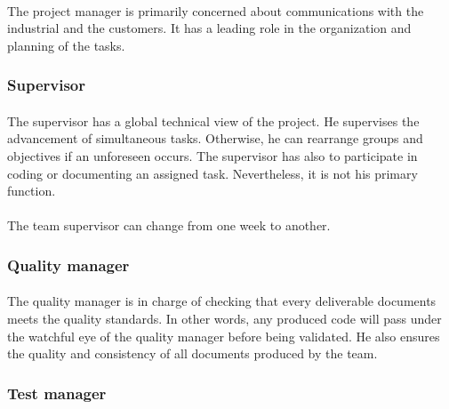 \documentclass{report}
\begin{document}
\paragraph{}
\hspace{4mm}The project manager is primarily concerned about communications with the industrial and the customers. It has a leading role in the organization and planning of the tasks.

\subsubsection{Supervisor}

\paragraph{}
\hspace{4mm}The supervisor has a global technical view of the project. He supervises the advancement of simultaneous tasks. Otherwise, he can rearrange groups and objectives if an unforeseen occurs. The supervisor has also to participate in coding or documenting an assigned task. Nevertheless, it is not his primary function.

\paragraph{}
\hspace{4mm}The team supervisor can change from one week to another.

\subsubsection{Quality manager}

\paragraph{}
\hspace{4mm}The quality manager is in charge of checking that every deliverable documents meets the quality standards. In other words, any produced code will pass under the watchful eye of the quality manager before being validated. He also ensures the quality and consistency of all documents produced by the team.

\subsubsection{Test manager}
\end{document}
